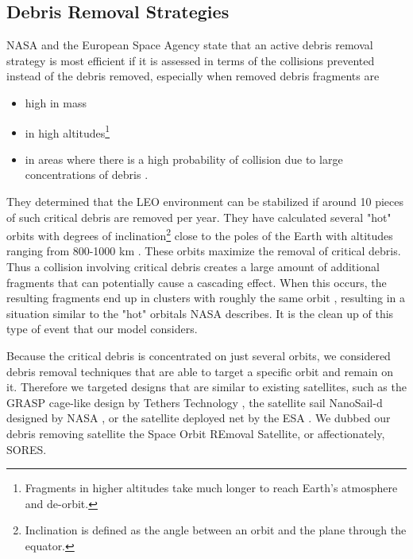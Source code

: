 \documentclass[12pt]{scrartcl}
\begin{document}
\subsection{Debris Removal Strategies}
NASA and the European Space Agency state that an active debris removal strategy is most efficient if it is assessed in terms of the collisions prevented instead of the debris removed, especially when removed debris fragments are 
\begin{itemize}
\item high in mass
\item in high altitudes\footnote{Fragments in higher altitudes take much longer to reach Earth's atmosphere and de-orbit.}
\item in areas where there is a high probability of collision due to large concentrations of debris \cite{ESA}.
\end{itemize}
They determined that the LEO environment can be stabilized if around 10 pieces of such critical debris are removed per year. They have calculated several "hot" orbits with degrees of inclination\footnote{Inclination is defined as the angle between an orbit and the plane through the equator.} close to the poles of the Earth with altitudes ranging from 800-1000 km \cite{ESA}. These orbits maximize the removal of critical debris. Thus a collision involving critical debris creates a large amount of additional fragments that can potentially cause a cascading effect. When this occurs, the resulting fragments end up in clusters with roughly the same orbit \cite{model}, resulting in a situation similar to the "hot" orbitals NASA describes. It is the clean up of this type of event that our model considers.

Because the critical debris is concentrated on just several orbits, we considered debris removal techniques that are able to target a specific orbit and remain on it. Therefore we targeted designs that are similar to existing satellites, such as the GRASP cage-like design by Tethers Technology \cite{tether}, the satellite sail NanoSail-d designed by NASA \cite{sail}, or the satellite deployed net by the ESA \cite{net}. We dubbed our debris removing satellite the Space Orbit REmoval Satellite, or affectionately, SORES.
\end{document}
